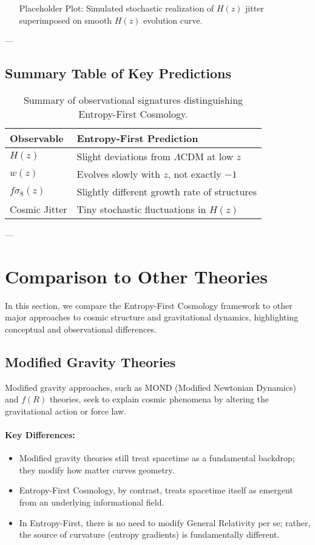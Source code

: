 \documentclass{article}
\begin{document}
\begin{itemize}
    \item [Placeholder] Plot: Simulated stochastic realization of $H(z)$ jitter superimposed on smooth $H(z)$ evolution curve.
\end{itemize}

---

\subsection{Summary Table of Key Predictions}

\begin{table}[h]
\centering
\begin{tabular}{|l|l|}
\hline
Observable & Entropy-First Prediction \\ \hline
$H(z)$ & Slight deviations from $\Lambda$CDM at low $z$ \\
$w(z)$ & Evolves slowly with $z$, not exactly $-1$ \\
$f\sigma_8(z)$ & Slightly different growth rate of structures \\
Cosmic Jitter & Tiny stochastic fluctuations in $H(z)$ \\
\hline
\end{tabular}
\caption{Summary of observational signatures distinguishing Entropy-First Cosmology.}
\end{table}

---

\section{Comparison to Other Theories}

In this section, we compare the Entropy-First Cosmology framework to other major approaches to cosmic structure and gravitational dynamics, highlighting conceptual and observational differences.

\subsection{Modified Gravity Theories}

Modified gravity approaches, such as MOND (Modified Newtonian Dynamics) and $f(R)$ theories, seek to explain cosmic phenomena by altering the gravitational action or force law.

\paragraph{Key Differences:}
\begin{itemize}
    \item Modified gravity theories still treat spacetime as a fundamental backdrop; they modify how matter curves geometry.
    \item Entropy-First Cosmology, by contrast, treats spacetime itself as emergent from an underlying informational field.
    \item In Entropy-First, there is no need to modify General Relativity per se; rather, the source of curvature (entropy gradients) is fundamentally different.
\end{itemize}
\end{document}
